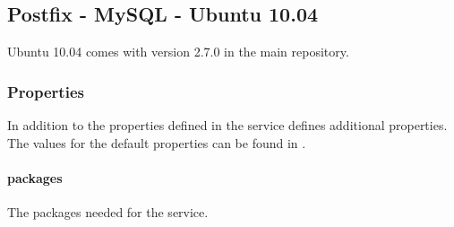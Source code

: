 \subsection{Postfix - MySQL - Ubuntu 10.04}

Ubuntu 10.04 comes with  version 2.7.0 in the main repository.

\subsubsection{Properties}

In addition to the properties defined in 
the  service defines additional properties.
The values for the default properties can be found
in .

\paragraph{packages}


The packages needed for the  service.

